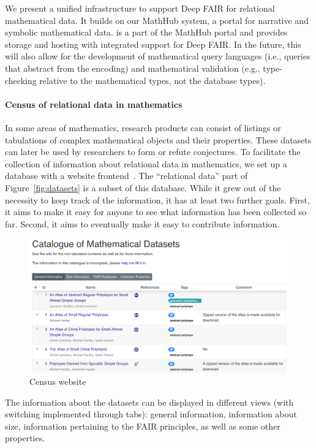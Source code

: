 We present a unified infrastructure to support Deep FAIR for relational mathematical data.
It builds on our MathHub system, a portal for narrative and symbolic mathematical data.
\dmh is a part of the MathHub portal and provides storage and hosting with integrated support for Deep FAIR.
In the future, this will also allow for the development of mathematical query languages (i.e., queries that abstract from the encoding) and mathematical validation (e.g., type-checking relative to the mathematical types, not the database types).

\paragraph{Census of relational data in mathematics}
In some areas of mathematics, research products can consist of
listings or tabulations of complex mathematical objects and their properties.
These datasets can later be used by researchers to form or refute conjectures.
To facilitate the collection of information about relational data in mathematics,
we set up a database with a website frontend~\cite{bercic:cmo:table}.
The ``relational data'' part of Figure~\ref{fig:datasets} is a subset of this database.
While it grew out of the necessity to keep track of the information, 
it has at least two further goals.
First, it aims to make it easy for anyone to see what information has been collected so far.
Second, it aims to eventually make it easy to contribute information.

\begin{figure}[ht]
  \includegraphics[width=\textwidth]{mathdb}
  \caption{Census website}\label{fig:census}
\end{figure}

The information about the datasets can be displayed in different views
(with switching implemented through tabs): 
general information, information about size, 
information pertaining to the FAIR principles,
as well as some other properties.

